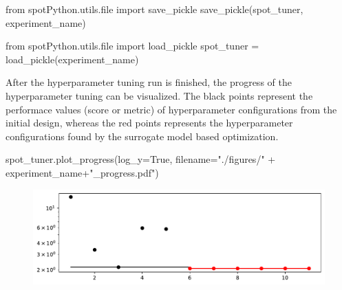 \documentclass[
  letterpaper,
  DIV=11,
  numbers=noendperiod]{scrreprt}
\newenvironment{Shaded}{\begin{snugshade}}{\end{snugshade}}
\newcommand{\BuiltInTok}[1]{\textcolor[rgb]{0.00,0.23,0.31}{#1}}
\newcommand{\ImportTok}[1]{\textcolor[rgb]{0.00,0.46,0.62}{#1}}
\newcommand{\NormalTok}[1]{\textcolor[rgb]{0.00,0.23,0.31}{#1}}
\newcommand{\OperatorTok}[1]{\textcolor[rgb]{0.37,0.37,0.37}{#1}}
\newcommand{\StringTok}[1]{\textcolor[rgb]{0.13,0.47,0.30}{#1}}
\newcommand{\VariableTok}[1]{\textcolor[rgb]{0.07,0.07,0.07}{#1}}
\begin{document}
\begin{Shaded}
\begin{Highlighting}[]
\ImportTok{from}\NormalTok{ spotPython.utils.}\BuiltInTok{file} \ImportTok{import}\NormalTok{ save\_pickle}
\NormalTok{save\_pickle(spot\_tuner, experiment\_name)}
\end{Highlighting}
\end{Shaded}

\begin{Shaded}
\begin{Highlighting}[]
\ImportTok{from}\NormalTok{ spotPython.utils.}\BuiltInTok{file} \ImportTok{import}\NormalTok{ load\_pickle}
\NormalTok{spot\_tuner }\OperatorTok{=}\NormalTok{ load\_pickle(experiment\_name)}
\end{Highlighting}
\end{Shaded}

After the hyperparameter tuning run is finished, the progress of the
hyperparameter tuning can be visualized. The black points represent the
performace values (score or metric) of hyperparameter configurations
from the initial design, whereas the red points represents the
hyperparameter configurations found by the surrogate model based
optimization.

\begin{Shaded}
\begin{Highlighting}[]
\NormalTok{spot\_tuner.plot\_progress(log\_y}\OperatorTok{=}\VariableTok{True}\NormalTok{, filename}\OperatorTok{=}\StringTok{"./figures/"} \OperatorTok{+}\NormalTok{ experiment\_name}\OperatorTok{+}\StringTok{"\_progress.pdf"}\NormalTok{)}
\end{Highlighting}
\end{Shaded}

\begin{figure}[H]

{\centering \includegraphics{13_spot_hpt_river_files/figure-pdf/cell-21-output-1.pdf}

}

\end{figure}
\end{document}
